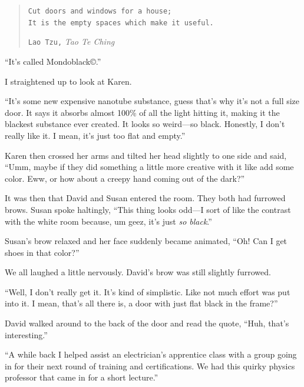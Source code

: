 \begin{quote}{}
\footnotesize\texttt{Cut doors and windows for a house;\\
It is the empty spaces which make it useful.}
  \begin{flushright}{}
    \scriptsize\texttt{Lao Tzu,} \textit{Tao Te Ching}
  \end{flushright}
\end{quote}


``It's called Mondoblack\copyright.''

I straightened up to look at Karen.

``It's some new expensive nanotube substance, guess that's why
it's not a full size door.  It says it absorbs almost 100\% of
all the light hitting it, making it the blackest substance ever
created.  It looks so weird---so black.  Honestly, I don't
really like it. I mean, it's just too flat and empty.''

Karen then crossed her arms and tilted her head slightly to one
side and said, ``Umm, maybe if they did something a little more
creative with it like add some color. Eww, or how
about a creepy hand coming out of the dark?''


It was then that David and Susan entered the room. They
both had furrowed brows. Susan spoke haltingly, ``This thing
looks odd---I sort of like the contrast with the white
room because, um geez, it's just \emph{so black}.''

Susan's brow relaxed and her face suddenly became animated,
``Oh! Can I get shoes in that color?''

We all laughed a little nervously. David's brow was still
slightly furrowed.

``Well, I don't really get it. It's kind of simplistic.  Like
not much effort was put into it. I mean, that's all there is, a
door with just flat black in the frame?''


David walked around to the back of the door and read the quote,
``Huh, that's interesting.''

``A while back I helped assist an electrician's apprentice class
with a group going in for their next round of training and
certifications. We had this quirky physics professor that came
in for a short lecture.''

